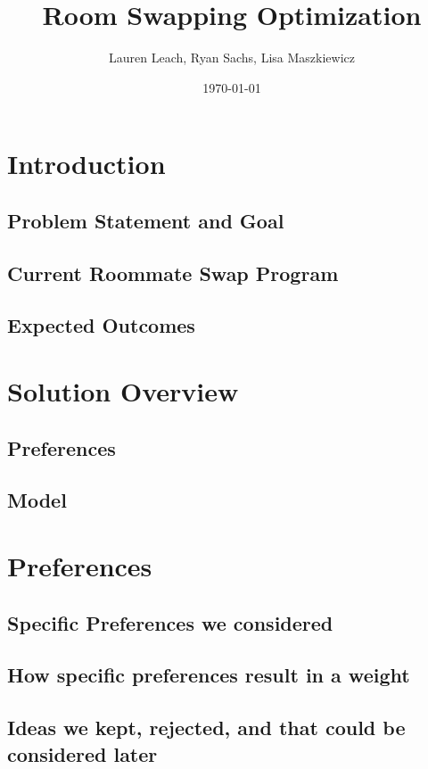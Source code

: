 \documentclass[12pt]{article}
\title{Room Swapping Optimization}
\author{Lauren Leach, Ryan Sachs, Lisa Maszkiewicz}
\date{\today}
\begin{document}
 
\maketitle
 
\begin{multicols}{2}

\section{Introduction}

\subsection{Problem Statement and Goal}
\subsection{Current Roommate Swap Program}
\subsection{Expected Outcomes}

\section{Solution Overview}
\subsection{Preferences}
\subsection{Model}

\section{Preferences}
\subsection{Specific Preferences we considered}
\subsection{How specific preferences result in a weight}
\subsection{Ideas we kept, rejected, and that could be considered later}


\end{multicols}
\end{document}
